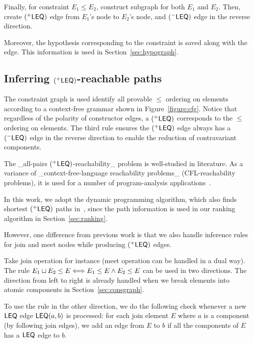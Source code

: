 Finally, for constraint $E_1\leq E_2$, construct subgraph for both
$E_1$ and $E_2$. Then, create $(^{+}\mathsf{LEQ})$ edge from $E_1$'s
node to $E_2$'s node, and $(^{-}\mathsf{LEQ})$ edge in the reverse
direction. 

Moreover, the hypothesis corresponding to the constraint is saved
along with the edge. This information is used in
Section~\ref{sec:hypograph}.

\subsection{Inferring $(^{+}\mathsf{LEQ})$-reachable paths}
\label{sec:leqedge}

The constraint graph is used identify all provable $\leq$ ordering on
elements according to a context-free grammar shown in
Figure~\ref{figure:cfg}. Notice that regardless of the polarity of
constructor edges, a $(^{+}\mathsf{LEQ})$ 
corresponds to the $\leq$ ordering on elements. The third rule ensures
the $(^{+}\mathsf{LEQ})$ edge always has a $(^{-}\mathsf{LEQ})$ edge
in the reverse direction to enable the reduction of contravariant
components.

The _all-pairs $(^{+}\mathsf{LEQ})$-reachability_ problem is
well-studied in literature\cite{melski-cflgraph,barrett-cflpath}. As a
variance of _context-free-language reachability problems_
(CFL-reachability problems), it is used for a number of
program-analysis applications~\cite{reps-graph}. 

In this work, we adopt the dynamic programming algorithm, which also
finds shortest $(^{+}\mathsf{LEQ})$ paths in~\cite{barrett-cflpath},
since the path information is used in our ranking algorithm in
Section~\ref{sec:ranking}.

However, one difference from previous work is that we also handle
inference rules for join and meet nodes while producing
$(^{+}\mathsf{LEQ})$ edges.

Take join operation for instance (meet operation can be handled in a
dual way). The rule $E_1\sqcup E_2\leq E \Longleftrightarrow E_1\leq E \land E_2 \leq
E $ can be used in two directions. The direction from left to right is
already handled when we break elements into atomic components in
Section~\ref{sec:consgraph}.

To use the rule in the other direction, we do the following check
whenever a new $\mathsf{LEQ}$ edge $\mathsf{LEQ}(a,b)$ is processed: for each join
element $E$ where $a$ is a component (by following join edges), we add
an edge from $E$ to $b$ if all the components of $E$ has a $\mathsf{LEQ}$ edge
to $b$. 

